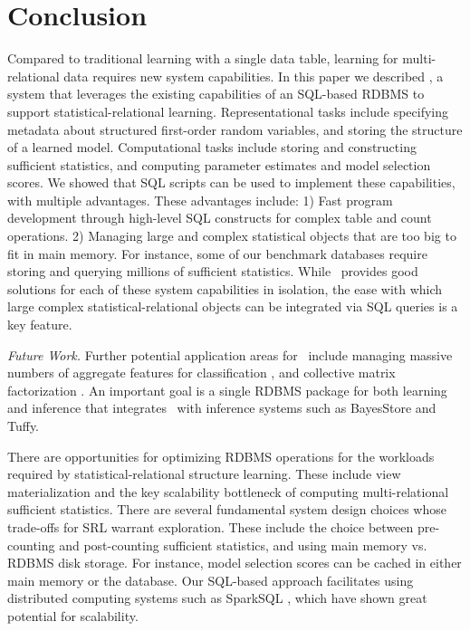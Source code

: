 \documentclass{article} %
\begin{document}
\section{Conclusion}
Compared to traditional learning with a single data table, learning for multi-relational data requires new system capabilities. In this paper we described \FB, a system that leverages the existing capabilities of an SQL-based RDBMS to support statistical-relational learning.
Representational tasks include specifying metadata about structured first-order random variables, and storing the structure of a learned model. Computational tasks include storing and constructing sufficient statistics, and computing parameter estimates and model selection scores. 
We showed that SQL scripts can be used to implement these capabilities, with multiple advantages. These advantages include: 1) Fast program development through high-level SQL constructs for complex table and count operations. 2) Managing large and complex statistical objects that are too big to fit in main memory. 
For instance, some of our benchmark databases require storing and querying millions of sufficient statistics. While \FB\ provides good solutions for each of these system capabilities in isolation, the ease with which large complex statistical-relational objects can be integrated via SQL queries is a key feature. 

{\em Future Work.} Further potential application areas for \FB\ include managing massive numbers of aggregate features for classification \cite{Popescul2007}, and collective matrix factorization \cite{Singh2008}. An important goal is a single RDBMS package for both learning and inference that integrates \FB\ with inference systems such as BayesStore and Tuffy. 

There are opportunities for optimizing RDBMS operations for the workloads required by statistical-relational structure learning. These include view materialization and the key scalability bottleneck of computing multi-relational sufficient statistics. There are several fundamental system design choices whose trade-offs for SRL warrant exploration. These include the choice between pre-counting and post-counting sufficient statistics, and using main memory vs. RDBMS disk storage. For instance, model selection scores can be cached in either main memory or the database. Our SQL-based approach facilitates using distributed computing systems such as SparkSQL \cite{Michael2015}, which have shown great potential for scalability. 
\end{document}
